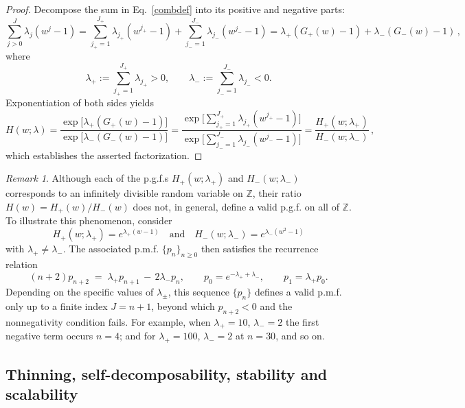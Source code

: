 \documentclass[a4paper,12pt]{amsart}
\theoremstyle{definition}
\theoremstyle{remark}
\newtheorem{Remark}{Remark}[section]
\begin{document}
\begin{proof}
Decompose the sum in Eq.~\ref{combdef} into its positive and negative parts:
\[
\sum_{j>0}^{J} \lambda_j (w^j - 1)
=
\sum_{j_{+}=1}^{J_{+}} \lambda_{j_{+}} (w^{j_{+}} - 1)
+
\sum_{j_{-}=1}^{J_{-}} \lambda_{j_{-}} (w^{j_{-}} - 1)
=
\lambda_{+} (G_{+}(w) - 1) + \lambda_{-} (G_{-}(w) - 1)\,,
\]
where
\[
\lambda_{+} := \sum_{j_{+}=1}^{J_{+}} \lambda_{j_{+}} > 0,
\qquad
\lambda_{-} := \sum_{j_{-}=1}^{J_{-}} \lambda_{j_{-}} < 0.
\]
Exponentiation of both sides yields
\begin{equation}\label{infdratio}
H(w;\lambda)
=
\frac{\exp\bigl[\lambda_{+}(G_{+}(w) - 1)\bigr]}
     {\exp\bigl[\lambda_{-}(G_{-}(w) - 1)\bigr]}
=
\frac{\exp\bigl[\sum_{j_{+}=1}^{J_{+}} \lambda_{j_{+}} (w^{j_{+}} - 1)\bigr]}
     {\exp\bigl[\sum_{j_{-}=1}^{J_{-}} \lambda_{j_{-}} (w^{j_{-}} - 1)\bigr]}
=
\frac{H_{+}(w;\lambda_{+})}{H_{-}(w;\lambda_{-})}\,,
\end{equation}
which establishes the asserted factorization.
\end{proof}  
\begin{Remark} Although each of the p.g.f.s $H_{+}(w;\lambda_+)$ and $H_{-}(w;\lambda_-)$ corresponds to an infinitely divisible random variable on $\mathbb{Z}$, their ratio $H(w)=H_{+}(w)/H_{-}(w)$ does not, in general, define a valid p.g.f. on all of $\mathbb{Z}$. To illustrate this phenomenon, consider 
\[
H_{+}(w;\lambda_+) = e^{\lambda_{+}(w-1)} 
\quad\text{and}\quad 
H_{-}(w;\lambda_-) = e^{\lambda_{-}(w^2-1)}
\]
with $\lambda_{+}\neq\lambda_{-}$. The associated p.m.f. $\{p_n\}_{n\ge 0}$ then satisfies the recurrence relation
\begin{equation}\label{comb12}
(n+2)p_{n+2} \;=\; \lambda_{+}p_{n+1} \,-\, 2 \lambda_{-}p_{n}, 
\qquad 
p_0=e^{-\lambda_{+}+\lambda_{-}}, 
\qquad 
p_1=\lambda_{+}p_{0}.
\end{equation}
Depending on the specific values of $\lambda_{\pm}$, this sequence $\{p_n\}$ defines a valid p.m.f. only up to a finite index $J=n+1$, beyond which $p_{n+2}<0$ and the nonnegativity condition fails. For example, when $\lambda_{+}=10$, $\lambda_{-}=2$ the first negative term occurs $n=4$; and for $\lambda_{+}=100$, $\lambda_{-}=2$ at $n=30$, and so on.
\end{Remark}

\subsection{Thinning, self-decomposability, stability and scalability} \label{sfdss}
\end{document}
